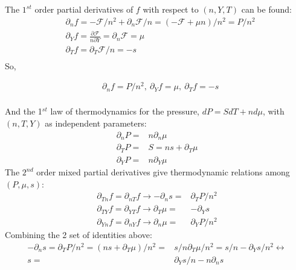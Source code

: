 \documentclass[11pt,letter]{article}
\begin{document}
The $1^{st}$ order partial derivatives of $f$ with respect to $(n,Y,T)$ can be found:
\begin{equation}
 \begin{split}
  &\partial_{n}f=-\mathcal{F}/n^{2} +\partial_{n}\mathcal{F}/n= (-\mathcal{F} + \mu n )/n^2=P/n^2\\
  &\partial_{Y} f = \frac{\partial \mathcal{F}}{n \partial Y}=\partial_{n}\mathcal{F}=\mu \\
  &\partial_Tf= \partial_T \mathcal{F}/n =-s\\
 \end{split}
\end{equation}
So,
\begin{mdframed}
\begin{equation}
 \begin{split}
  &\partial_{n}f=P/n^2, \  \partial_{Y} f =\mu, \  \partial_Tf=-s\\
 \end{split}
\end{equation} 
\end{mdframed}
And the 1$^{st}$ law of thermodynamics for the pressure, $dP = S dT + n d\mu$, with $(n,T,Y)$ as independent parameters:
\begin{equation}
 \begin{split}
  \partial_n P =&n \partial_n \mu\\
  \partial_T P =&S = n s+\partial_T \mu\\
  \partial_Y P =&n \partial_Y \mu 
 \end{split}
\end{equation} 
The $2^{nd}$ order mixed partial derivatives give thermodynamic relations among $(P,\mu,s)$:
\begin{equation}
 \begin{split}
  \partial_{Tn}f=\partial_{nT}f \rightarrow -\partial_{n}s=&\partial_TP/n^2\\
  \partial_{TY}f=\partial_{YT}f \rightarrow \partial_T\mu=&-\partial_Ys\\
  \partial_{Yn}f=\partial_{nY}f \rightarrow \partial_n\mu=&\partial_YP/n^2
 \end{split}
\end{equation}
Combining the 2 set of identities above:
\begin{equation}
 \begin{split}
  -\partial_{n}s=\partial_TP/n^2=(n s+\partial_T \mu)/n^2=&s/n\partial_T \mu/n^2=s/n-\partial_Ys/n^2\leftrightarrow\\
  s=&\partial_Ys/n-n\partial_ns\\
 \end{split}
\end{equation}
\end{document}

